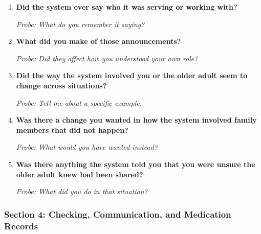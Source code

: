 \begin{enumerate}[resume]
  \item \textbf{Did the system ever say who it was serving or working with?}

  \textit{Probe: What do you remember it saying?}
  \item \textbf{What did you make of those announcements?}

  \textit{Probe: Did they affect how you understood your own role?}
  \item \textbf{Did the way the system involved you or the older adult seem to change across situations?}

  \textit{Probe: Tell me about a specific example.}
  \item \textbf{Was there a change you wanted in how the system involved family members that did not happen?}

  \textit{Probe: What would you have wanted instead?}
  \item \textbf{Was there anything the system told you that you were unsure the older adult knew had been shared?}

  \textit{Probe: What did you do in that situation?}
\end{enumerate}

\subsubsection{Section 4: Checking, Communication, and Medication Records}

